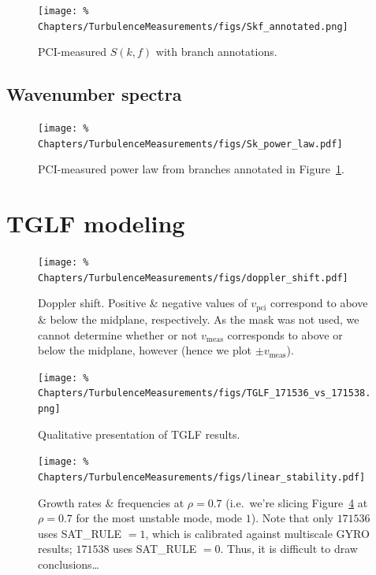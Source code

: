 \begin{figure}
  \centering
  \texttt{[image: \%
    Chapters/TurbulenceMeasurements/figs/Skf\_annotated.png]}
  \caption[PCI-measured $S(k, f)$ with branch annotations]{%
    PCI-measured $S(k, f)$ with branch annotations.
  }
\label{fig:TurbulenceMeasurements:Skf_annotated}
\end{figure}


\subsection{Wavenumber spectra}
\begin{figure}
  \centering
  \texttt{[image: \%
    Chapters/TurbulenceMeasurements/figs/Sk\_power\_law.pdf]}
  \caption[PCI-measured power law]{%
    PCI-measured power law from branches annotated in
    Figure~\ref{fig:TurbulenceMeasurements:Skf_annotated}.
  }
\label{fig:TurbulenceMeasurements:Sk_power_law}
\end{figure}


\section{TGLF modeling}
\begin{figure}[h!]
  \centering
  \texttt{[image: \%
    Chapters/TurbulenceMeasurements/figs/doppler\_shift.pdf]}
  \caption[Doppler shift]{%
    Doppler shift. Positive \& negative values of $v_{\text{pci}}$
    correspond to above \& below the midplane, respectively.
    As the mask was not used, we cannot determine whether or not
    $v_{\text{meas}}$ corresponds to above or below the midplane, however
    (hence we plot $\pm v_{\text{meas}}$).
  }
\label{fig:TurbulenceMeasurements:doppler_shift}
\end{figure}

\begin{figure}[h!]
  \centering
  \texttt{[image: \%
    Chapters/TurbulenceMeasurements/figs/TGLF\_171536\_vs\_171538.png]}
  \caption[Qualitative presentation of TGLF results]{%
    Qualitative presentation of TGLF results.
  }
\label{fig:TurbulenceMeasurements:TGLF_171536_vs_171538}
\end{figure}

\begin{figure}[h!]
  \centering
  \texttt{[image: \%
    Chapters/TurbulenceMeasurements/figs/linear\_stability.pdf]}
  \caption[Growth rates \& frequencies at $\rho=0.7$]{%
    Growth rates \& frequencies at $\rho=0.7$
    (i.e.\ we're slicing
    Figure~\ref{fig:TurbulenceMeasurements:TGLF_171536_vs_171538}
    at $\rho = 0.7$ for the most unstable mode, mode $1$).
    Note that only $171536$ uses SAT\_RULE $= 1$,
    which is calibrated against multiscale GYRO results;
    $171538$ uses SAT\_RULE $= 0$.
    Thus, it is difficult to draw conclusions\ldots
  }
\label{fig:TurbulenceMeasurements:linear_stability}
\end{figure}

